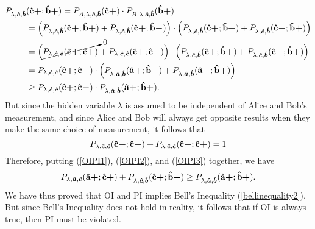 \begin{equation}\label{OIPI2}
\begin{split}
 P_{\lambda,\bm{\hat{c}},\bm{\hat{b}}}&(\vb{\hat{{c}}}\bm{+};\vb{\hat{{b}}}\bm{+})=P_{A,\lambda,\bm{\hat{c}},\bm{\hat{b}}}(\vb{\hat{{c}}}\bm{+})\cdot P_{B,\lambda,\bm{\hat{c}},\bm{\hat{b}}}(\vb{\hat{{b}}}\bm{+})\\
 &= \Big( P_{\lambda,\bm{\hat{c}},\bm{\hat{b}}}(\vb{\hat{{c}}}\bm{+};\vb{\hat{{b}}}\bm{+})+ P_{\lambda,\bm{\hat{c}},\bm{\hat{b}}}(\vb{\hat{{c}}}\bm{+};\vb{\hat{{b}}}\bm{-})\Big)\cdot\Big( P_{\lambda,\bm{\hat{c}},\bm{\hat{b}}}(\vb{\hat{{c}}}\bm{+};\vb{\hat{{b}}}\bm{+})+ P_{\lambda,\bm{\hat{c}},\bm{\hat{b}}}(\vb{\hat{{c}}}\bm{-};\vb{\hat{{b}}}\bm{+})\Big)\\
 &= \Big(  \cancelto{0}{P_{\lambda,\bm{\hat{c}},\bm{\hat{c}}}(\vb{\hat{{c}}}\bm{+};\vb{\hat{{c}}}\bm{+})}+ P_{\lambda,\bm{\hat{c}},\bm{\hat{c}}}(\vb{\hat{{c}}}\bm{+};\vb{\hat{{c}}}\bm{-})\Big)\cdot\Big(P_{\lambda,\bm{\hat{c}},\bm{\hat{b}}}(\vb{\hat{{c}}}\bm{+};\vb{\hat{{b}}}\bm{+})+ P_{\lambda,\bm{\hat{c}},\bm{\hat{b}}}(\vb{\hat{{c}}}\bm{-};\vb{\hat{{b}}}\bm{+})\Big)\\
 &=P_{\lambda,\bm{\hat{c}},\bm{\hat{c}}}(\vb{\hat{{c}}}\bm{+};\vb{\hat{{c}}}\bm{-})\cdot\Big( P_{\lambda,\bm{\hat{a}},\bm{\hat{b}}}(\vb{\hat{{a}}}\bm{+};\vb{\hat{{b}}}\bm{+})+ P_{\lambda,\bm{\hat{a}},\bm{\hat{b}}}(\vb{\hat{{a}}}\bm{-};\vb{\hat{{b}}}\bm{+})\Big)\\
 &\geq P_{\lambda,\bm{\hat{c}},\bm{\hat{c}}}(\vb{\hat{{c}}}\bm{+};\vb{\hat{{c}}}\bm{-})\cdot P_{\lambda,\bm{\hat{a}},\bm{\hat{b}}}(\vb{\hat{{a}}}\bm{+};\vb{\hat{{b}}}\bm{+}) .
\end{split}
\end{equation}
But since the hidden variable $\lambda$ is assumed to be independent of Alice and Bob's measurement, and since Alice and Bob will always get opposite results when they make the same choice of measurement, it follows that 
\begin{equation}\label{OIPI3}
P_{\lambda,\bm{\hat{c}},\bm{\hat{c}}}(\vb{\hat{{c}}}\bm{+};\vb{\hat{{c}}}\bm{-})+P_{\lambda,\bm{\hat{c}},\bm{\hat{c}}}(\vb{\hat{{c}}}\bm{-};\vb{\hat{{c}}}\bm{+})=1
\end{equation}
Therefore, putting (\ref{OIPI1}), (\ref{OIPI2}), and (\ref{OIPI3}) together, we have
\begin{equation}
P_{\lambda,\bm{\hat{a}},\bm{\hat{c}}}(\vb{\hat{{a}}}\bm{+};\vb{\hat{{c}}}\bm{+})+P_{\lambda,\bm{\hat{c}},\bm{\hat{b}}}(\vb{\hat{{c}}}\bm{+};\vb{\hat{{b}}}\bm{+})\geq P_{\lambda,\bm{\hat{a}},\bm{\hat{b}}}(\vb{\hat{{a}}}\bm{+};\vb{\hat{{b}}}\bm{+}).
\end{equation}
We have thus proved that OI and PI implies Bell's Inequality (\ref{bellinequality2}). But since Bell's Inequality does not hold in reality, it follows that if OI is always true, then PI must be violated.\label{OIPIproofend}


